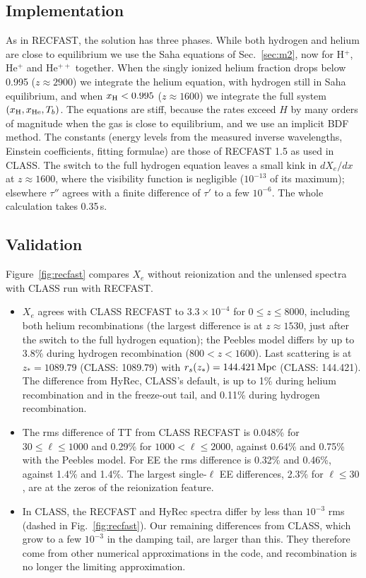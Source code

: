 \subsection{Implementation}

As in RECFAST, the solution has three phases. While both hydrogen and helium are close to equilibrium we use the
Saha equations of Sec.~\ref{sec:m2}, now for H$^+$, He$^+$ and He$^{++}$ together. When the singly ionized helium
fraction drops below 0.995 ($z\approx2900$) we integrate the helium equation, with hydrogen still in Saha
equilibrium, and when $x_{\rm H}<0.995$ ($z\approx1600$) we integrate the full system $(x_{\rm H},x_{\rm He},T_b)$.
The equations are stiff, because the rates exceed $H$ by many orders of magnitude when the gas is close to
equilibrium, and we use an implicit BDF method. The constants (energy levels from the measured inverse wavelengths,
Einstein coefficients, fitting formulae) are those of RECFAST 1.5 as used in CLASS. The switch to the full hydrogen
equation leaves a small kink in $dX_e/dx$ at $z\approx1600$, where the visibility function is negligible
($10^{-13}$ of its maximum); elsewhere $\tau''$ agrees with a finite difference of $\tau'$ to a few $10^{-6}$. The whole calculation takes
0.35\,s.

\subsection{Validation}

Figure~\ref{fig:recfast} compares $X_e$ without reionization and the unlensed spectra with CLASS run with RECFAST.
\begin{itemize}
\item $X_e$ agrees with CLASS RECFAST to $3.3\times10^{-4}$ for $0\le z\le8000$, including
      both helium recombinations (the largest difference is at $z\approx1530$, just after the switch to the full hydrogen equation); the Peebles model differs by up to 3.8\%
      during hydrogen recombination ($800<z<1600$). Last scattering is at $z_*=1089.79$
      (CLASS: 1089.79) with $r_s(z_*)=144.421\,\mathrm{Mpc}$ (CLASS: 144.421).
      The difference from HyRec, CLASS's default, is up to 1\% during
      helium recombination and in the freeze-out tail, and 0.11\% during
      hydrogen recombination.
\item The rms difference of TT from CLASS RECFAST is 0.048\% for
      $30\le\ell\le1000$ and 0.29\% for $1000<\ell\le2000$, against
      0.64\% and 0.75\% with the Peebles
      model. For EE the rms difference is 0.32\% and
      0.46\%, against 1.4\% and
      1.4\%. The largest single-$\ell$ EE differences,
      2.3\% for $\ell\le30$, are at the zeros of the reionization feature.
\item In CLASS, the RECFAST and HyRec spectra differ by less than $10^{-3}$ rms (dashed in Fig.~\ref{fig:recfast}).
      Our remaining differences from CLASS, which grow to a few $10^{-3}$ in the damping tail, are larger than this.
      They therefore come from other numerical approximations in the code, and recombination is no longer the
      limiting approximation.
\end{itemize}

